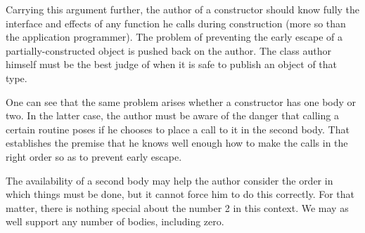 Carrying this argument further, the author of a constructor should know fully the
interface and effects of any function he calls during construction (more so than the
application programmer).  The problem of preventing the early escape of a
partially-constructed object is pushed back on the author.  The class author himself must
be the best judge of when it is safe to publish an object of that type.  

One can see that the same problem arises whether a constructor has one body or two.  In
the latter case, the author must be aware of the danger that calling a certain routine
poses if he chooses to place a call to it in the second body.  That establishes the
premise that he knows well enough how to make the calls in the right order so as to
prevent early escape.  

The availability of a second body may help the author consider the order in which things
must be done, but it cannot force him to do this correctly.  For that matter, there is
nothing special about the number 2 in this context.  We may as well support any number of bodies,
including zero.
